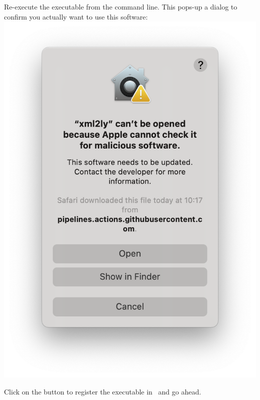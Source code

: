 Re-execute the executable from the command line. This pops-up a dialog to confirm you actually want to use this software:\\
\includegraphics[scale=0.35]{../mfgraphics/mfgraphicsMacOSConfirmOpening.png}

Click on the  button to register the executable in \Gatekeeper\ and go ahead.

